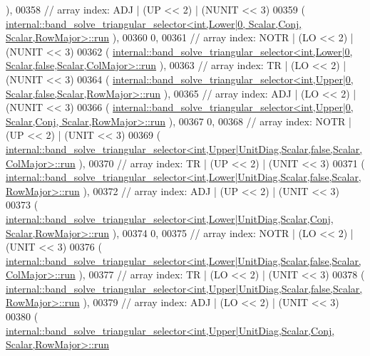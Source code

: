 \begin{DoxyCode}
      ),
00358     \textcolor{comment}{// array index: ADJ   | (UP << 2) | (NUNIT << 3)}
00359     (
      \hyperlink{structinternal_1_1band__solve__triangular__selector}{internal::band\_solve\_triangular\_selector<int,Lower|0,       Scalar,Conj, Scalar,RowMajor>::run}
      ),
00360     0,
00361     \textcolor{comment}{// array index: NOTR  | (LO << 2) | (NUNIT << 3)}
00362     (
      \hyperlink{structinternal_1_1band__solve__triangular__selector}{internal::band\_solve\_triangular\_selector<int,Lower|0,       Scalar,false,Scalar,ColMajor>::run}
      ),
00363     \textcolor{comment}{// array index: TR    | (LO << 2) | (NUNIT << 3)}
00364     (
      \hyperlink{structinternal_1_1band__solve__triangular__selector}{internal::band\_solve\_triangular\_selector<int,Upper|0,       Scalar,false,Scalar,RowMajor>::run}
      ),
00365     \textcolor{comment}{// array index: ADJ   | (LO << 2) | (NUNIT << 3)}
00366     (
      \hyperlink{structinternal_1_1band__solve__triangular__selector}{internal::band\_solve\_triangular\_selector<int,Upper|0,       Scalar,Conj, Scalar,RowMajor>::run}
      ),
00367     0,
00368     \textcolor{comment}{// array index: NOTR  | (UP << 2) | (UNIT  << 3)}
00369     (
      \hyperlink{structinternal_1_1band__solve__triangular__selector}{internal::band\_solve\_triangular\_selector<int,Upper|UnitDiag,Scalar,false,Scalar,ColMajor>::run}
      ),
00370     \textcolor{comment}{// array index: TR    | (UP << 2) | (UNIT  << 3)}
00371     (
      \hyperlink{structinternal_1_1band__solve__triangular__selector}{internal::band\_solve\_triangular\_selector<int,Lower|UnitDiag,Scalar,false,Scalar,RowMajor>::run}
      ),
00372     \textcolor{comment}{// array index: ADJ   | (UP << 2) | (UNIT  << 3)}
00373     (
      \hyperlink{structinternal_1_1band__solve__triangular__selector}{internal::band\_solve\_triangular\_selector<int,Lower|UnitDiag,Scalar,Conj, Scalar,RowMajor>::run}
      ),
00374     0,
00375     \textcolor{comment}{// array index: NOTR  | (LO << 2) | (UNIT  << 3)}
00376     (
      \hyperlink{structinternal_1_1band__solve__triangular__selector}{internal::band\_solve\_triangular\_selector<int,Lower|UnitDiag,Scalar,false,Scalar,ColMajor>::run}
      ),
00377     \textcolor{comment}{// array index: TR    | (LO << 2) | (UNIT  << 3)}
00378     (
      \hyperlink{structinternal_1_1band__solve__triangular__selector}{internal::band\_solve\_triangular\_selector<int,Upper|UnitDiag,Scalar,false,Scalar,RowMajor>::run}
      ),
00379     \textcolor{comment}{// array index: ADJ   | (LO << 2) | (UNIT  << 3)}
00380     (
      \hyperlink{structinternal_1_1band__solve__triangular__selector}{internal::band\_solve\_triangular\_selector<int,Upper|UnitDiag,Scalar,Conj, Scalar,RowMajor>::run}

\end{DoxyCode}
